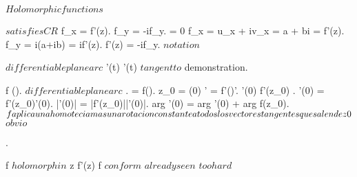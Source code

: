 \documentclass[../Main/main]{subfiles}
\begin{document}
\unit{ $ Holomorphic functions $ }
{
	
	{
		{
			 $ satisfies CR $
		}
		\holds
		{
			f_x = f'(z).
			f_y = -if_y.
			 = 0
		}
		\demonstration
		{
			f_x = u_x + iv_x = a + bi = f'(z).
			f_y = i(a+ib) = if'(z).
			f'(z) = -if_y.
			$notation$
		}
	}


	{
		{
			\gamma $ differentiable plane arc $ \suchthat {}
			{
				\gamma'(t) 
			}
		}
		\holds
		{
			\gamma'(t) $ tangent to $ \gamma
		}
		\demonstration
		{
			demonstration.
		}
	}


	{
		{
			f \in \Hc(\Uc).
			\gamma $ differentiable plane arc $ \suchthat \gamma \subset \Uc.
			\sigma = f(\gamma).
			z_0 = \gamma(0)
		}
		\holds
		{
			\sigma' = f'(\gamma)\gamma'.
			\gamma'(0)  \imp f'(z_0) .
			\sigma'(0) = f'(z_0)\gamma'(0).
			|\sigma'(0)| = |f'(z_0)||\gamma'(0)|.
			arg \sigma'(0) = arg \gamma'(0) + arg f(z_0).
			$ f aplica una homotecia mas una rotacion constante a todos los \\ vectores tangentes que salen de z0 $
		}
		\demonstration
		{
			$obvio$
		}
	}


	
	
	{
		{
			.
			
		}
		\holds
		{
			f $holomorph in $ z \suchthat f'(z)  \ifandonlyif f $ conform $
		}
		\demonstration
		{
			\rightway
			{
				$ already seen $
			}
			\leftway
			{
				$ too hard $
			}	
		}
	}

}
\end{document}
